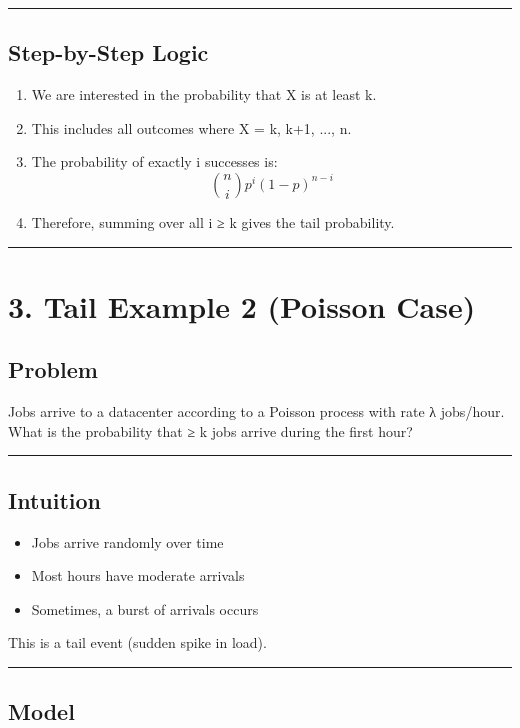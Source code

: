 \documentclass[12pt]{article}
\begin{document}
\hrule

\subsection*{Step-by-Step Logic}

\begin{enumerate}
\item We are interested in the probability that X is at least k.
\item This includes all outcomes where X = k, k+1, ..., n.
\item The probability of exactly i successes is:
\[
\binom{n}{i} p^i (1-p)^{n-i}
\]
\item Therefore, summing over all i ≥ k gives the tail probability.
\end{enumerate}

\hrule

\section*{3. Tail Example 2 (Poisson Case)}

\subsection*{Problem}

Jobs arrive to a datacenter according to a Poisson process with rate λ jobs/hour. What is the probability that ≥ k jobs arrive during the first hour?

\hrule

\subsection*{Intuition}

\begin{itemize}
\item Jobs arrive randomly over time
\item Most hours have moderate arrivals
\item Sometimes, a burst of arrivals occurs
\end{itemize}

This is a tail event (sudden spike in load).

\hrule

\subsection*{Model}
\end{document}
